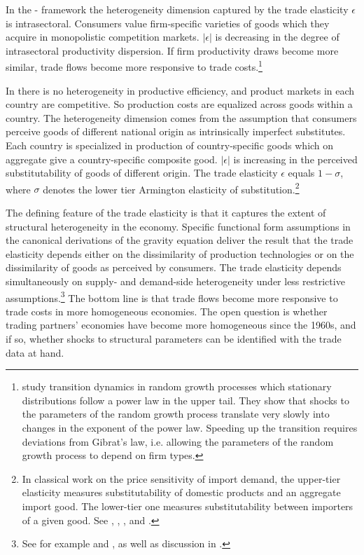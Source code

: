 \documentclass[12pt,twoside,a4paper,notitlepage]{article}
\begin{document}
In the \cite{Melitz2003}-\cite{Chaney2008} framework the heterogeneity dimension captured by the trade elasticity $ \epsilon $ is intrasectoral.
Consumers value firm-specific varieties of goods which they acquire in monopolistic competition markets.
$ |\epsilon| $ is decreasing in the degree of intrasectoral productivity dispersion.
If firm productivity draws become more similar, trade flows become more responsive to trade costs.\footnote{\cite{Gabaix2016} study transition dynamics in random growth processes which stationary distributions follow a power law in the upper tail. They show that shocks to the parameters of the random growth process translate very slowly into changes in the exponent of the power law. Speeding up the transition requires deviations from Gibrat's law, i.e. allowing the parameters of the random growth process to depend on firm types.}  
 
In \cite{Anderson2003} there is no heterogeneity in productive efficiency, and
product markets in each country are competitive.
So production costs are equalized across goods within a country.
The heterogeneity dimension comes from the assumption that consumers perceive goods of different national origin as intrinsically imperfect substitutes.
Each country is specialized in production of country-specific goods which on aggregate give a country-specific composite good.
$|\epsilon|$ is increasing in the perceived substitutability of goods of different origin. 
The trade elasticity $\epsilon$ equals $1-\sigma$, where $\sigma$ denotes the lower tier Armington elasticity of substitution.\footnote{In classical work on the price sensitivity of import demand, the upper-tier elasticity measures substitutability of domestic products and an aggregate import good.
The lower-tier one measures substitutability between importers of a given good.
See \cite{Sato1967}, \cite{Reinert1991}, \cite{Saito2004}, and \cite{Feenstra2018}.} 

The defining feature of the trade elasticity is that it captures the extent of structural heterogeneity in the economy. 
Specific functional form assumptions in the canonical derivations of the gravity equation deliver the result that the trade elasticity depends either on the dissimilarity of production technologies or on the dissimilarity of goods as perceived by consumers. 
The trade elasticity depends simultaneously on supply- and demand-side heterogeneity under less restrictive assumptions.\footnote{See for example \cite{Feenstra2018a} and \cite{Bas2017}, as well as discussion in \cite{Head2014}.}
The bottom line is that trade flows become more responsive to trade costs in more homogeneous economies.
The open question is whether trading partners' economies have become more homogeneous since the 1960s, and if so, whether shocks to structural parameters can be identified with the trade data at hand.
\end{document}
